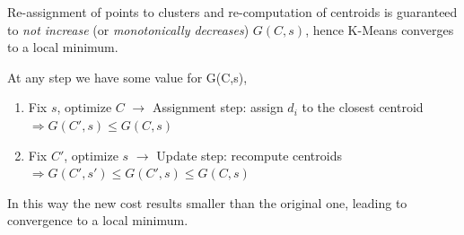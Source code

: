 Re-assignment of points to clusters and re-computation of centroids is guaranteed to \textit{not increase} (or \textit{monotonically decreases}) $G(C,s)$, hence K-Means converges to a local minimum.

At any step we have some value for G(C,s),
\begin{enumerate}
	\item Fix $s$, optimize $C$ $\rightarrow$ Assignment step: assign $d_i$ to the closest centroid $\Rightarrow G(C',s) \leq G(C,s)$
	\item Fix $C'$, optimize $s$ $\rightarrow$ Update step: recompute centroids $\Rightarrow G(C',s') \leq G(C',s) \leq G(C,s)$
\end{enumerate}
In this way the new cost results smaller than the original one, leading to convergence to a local minimum.